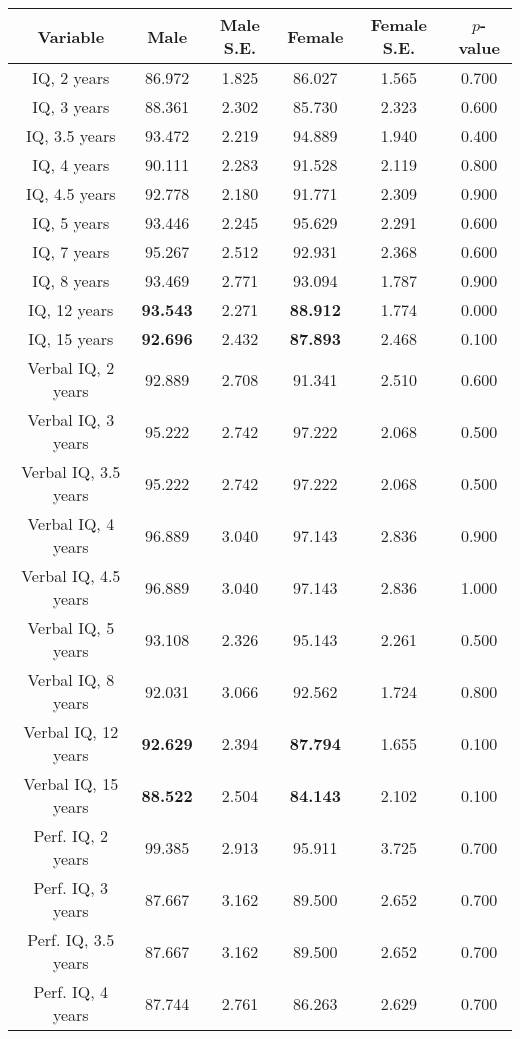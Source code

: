 \begin{longtable}{c c c c c c}
\toprule
\textbf{Variable} & \textbf{Male} & \textbf{Male S.E.}  & \textbf{Female} & \textbf{Female S.E.} & \textbf{$ p $-value} \\
\midrule
IQ, 2 years & 86.972 & 1.825 &  86.027 & 1.565 & 0.700 \\
IQ, 3 years & 88.361 & 2.302 &  85.730 & 2.323 & 0.600 \\
IQ, 3.5 years & 93.472 & 2.219 &  94.889 & 1.940 & 0.400 \\
IQ, 4 years & 90.111 & 2.283 &  91.528 & 2.119 & 0.800 \\
IQ, 4.5 years & 92.778 & 2.180 &  91.771 & 2.309 & 0.900 \\
IQ, 5 years & 93.446 & 2.245 &  95.629 & 2.291 & 0.600 \\
IQ, 7 years & 95.267 & 2.512 &  92.931 & 2.368 & 0.600 \\
IQ, 8 years & 93.469 & 2.771 &  93.094 & 1.787 & 0.900 \\
IQ, 12 years & \textbf{93.543} & 2.271 &  \textbf{88.912} & 1.774 & 0.000 \\
IQ, 15 years & \textbf{92.696} & 2.432 &  \textbf{87.893} & 2.468 & 0.100 \\
Verbal IQ, 2 years & 92.889 & 2.708 &  91.341 & 2.510 & 0.600 \\
Verbal IQ, 3 years & 95.222 & 2.742 &  97.222 & 2.068 & 0.500 \\
Verbal IQ, 3.5 years & 95.222 & 2.742 &  97.222 & 2.068 & 0.500 \\
Verbal IQ, 4 years & 96.889 & 3.040 &  97.143 & 2.836 & 0.900 \\
Verbal IQ, 4.5 years & 96.889 & 3.040 &  97.143 & 2.836 & 1.000 \\
Verbal IQ, 5 years & 93.108 & 2.326 &  95.143 & 2.261 & 0.500 \\
Verbal IQ, 8 years & 92.031 & 3.066 &  92.562 & 1.724 & 0.800 \\
Verbal IQ, 12 years & \textbf{92.629} & 2.394 &  \textbf{87.794} & 1.655 & 0.100 \\
Verbal IQ, 15 years & \textbf{88.522} & 2.504 &  \textbf{84.143} & 2.102 & 0.100 \\
Perf. IQ, 2 years & 99.385 & 2.913 &  95.911 & 3.725 & 0.700 \\
Perf. IQ, 3 years & 87.667 & 3.162 &  89.500 & 2.652 & 0.700 \\
Perf. IQ, 3.5 years & 87.667 & 3.162 &  89.500 & 2.652 & 0.700 \\
Perf. IQ, 4 years & 87.744 & 2.761 &  86.263 & 2.629 & 0.700 \\

\end{longtable}
